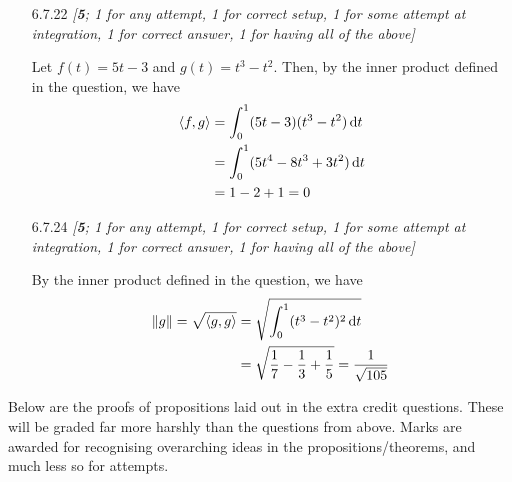 \documentclass{amsart}
\theoremstyle{definition}
\theoremstyle{definition}
\DeclareMathOperator{\1}{\mathbbm{1}}
\DeclareMathOperator{\D}{\dif}
\newcommand{\innerproduct}[2]{\left\langle #1,#2 \right\rangle}
\begin{document}
\begin{enumerate}[itemsep = 2mm]
		\item[6.7.22] \textit{[\textbf{5}; 1 for any attempt, 1 for correct setup, 1 for some attempt at integration, 1 for correct answer, 1 for having all of the above]}
		
		Let $f(t) = 5t - 3$ and $g(t) = t^3 - t^2$. Then, by the inner product defined in the question, we have
		\begin{align*}
			\innerproduct{f}{g} &= \int_{0}^{1} (5t-3)(t^3 - t^2) \D t \\
			&= \int_{0}^{1} (5t^4 - 8t^3 + 3t^2) \D t \\
			&= 1 - 2 + 1 = 0
		\end{align*}
		
		
		\item[6.7.24] \textit{[\textbf{5}; 1 for any attempt, 1 for correct setup, 1 for some attempt at integration, 1 for correct answer, 1 for having all of the above]}
	
		By the inner product defined in the question, we have
		\begin{align*}
			\norm{g} = \sqrt{\innerproduct{g}{g}} &= \sqrt{\int_0^1 (t^3 - t^2)^2 \D t} \\
			&= \sqrt{\frac{1}{7} - \frac{1}{3} + \frac{1}{5}} = \frac{1}{\sqrt{105}}
		\end{align*}
	\end{enumerate}
	
	
	\clearpage
	
	Below are the proofs of propositions laid out in the extra credit questions. These will be graded far more harshly than the questions from above. Marks are awarded for recognising overarching ideas in the propositions/theorems, and much less so for attempts. %
	
\end{document}
